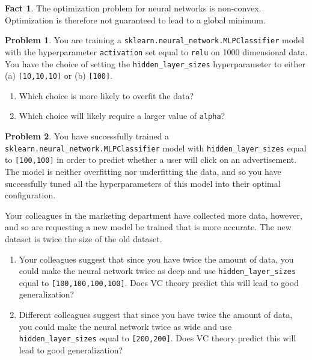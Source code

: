 \documentclass[10pt]{exam}
\theoremstyle{definition}
\newtheorem{problem}{Problem}
\newtheorem{fact}{Fact}
\begin{document}
\begin{fact}
    The optimization problem for neural networks is non-convex.
    Optimization is therefore not guaranteed to lead to a global minimum.
\end{fact}


\newpage
\begin{problem}
    You are training a \lstinline{sklearn.neural_network.MLPClassifier} model with the hyperparameter \lstinline{activation} set equal to \lstinline{relu} on 1000 dimensional data.
    You have the choice of setting the \lstinline{hidden_layer_sizes} hyperparameter to either (a) \lstinline{[10,10,10]} or (b) \lstinline{[100]}.
    \begin{enumerate}
        \item Which choice is more likely to overfit the data?
            \vspace{3in}
        \item Which choice will likely require a larger value of \lstinline{alpha}?
            \vspace{3in}
    \end{enumerate}
\end{problem}

\newpage
\begin{problem}
    You have successfully trained a \lstinline{sklearn.neural_network.MLPClassifier} model with \lstinline{hidden_layer_sizes} equal to \lstinline{[100,100]} in order to predict whether a user will click on an advertisement.
    The model is neither overfitting nor underfitting the data,
    and so you have successfully tuned all the hyperparameters of this model into their optimal configuration.

    Your colleagues in the marketing department have collected more data, however, and so are requesting a new model be trained that is more accurate.
    The new dataset is twice the size of the old dataset.

    \begin{enumerate}
        \item Your colleagues suggest that since you have twice the amount of data, you could make the neural network twice as deep and use \lstinline{hidden_layer_sizes} equal to \lstinline{[100,100,100,100]}.
            Does VC theory predict this will lead to good generalization?

            \vspace{4in}
        \item Different colleagues suggest that since you have twice the amount of data, you could make the neural network twice as wide and use \lstinline{hidden_layer_sizes} equal to \lstinline{[200,200]}.
            Does VC theory predict this will lead to good generalization?
    \end{enumerate}
\end{problem}
\end{document}
